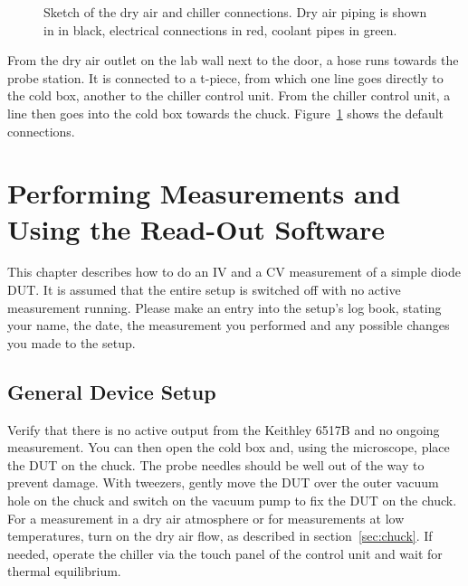 \documentclass[a4paper]{article}
\begin{document}
\begin{figure}[hbtp!]
\caption[Dry Air and Chiller Connections]{Sketch of the dry air and chiller connections. Dry air piping is shown in in black, electrical connections in red, coolant pipes in green.}
\label{fig:dryair}
\end{figure}

From the dry air outlet on the lab wall next to the door, a hose runs towards the probe station.
It is connected to a t-piece, from which one line goes directly to the cold box, another to the chiller control unit.
From the chiller control unit, a line then goes into the cold box towards the chuck.
Figure~\ref{fig:dryair} shows the default connections.\\

\afterpage{\null\newpage} %
\newpage

\section{Performing Measurements and Using the Read-Out Software}
\label{sec:meas}

This chapter describes how to do an IV and a CV measurement of a simple diode DUT.
It is assumed that the entire setup is switched off with no active measurement running.
Please make an entry into the setup's log book, stating your name, the date, the measurement you performed and any possible changes you made to the setup.\\

\subsection{General Device Setup}
\label{sec:devicesetup}

Verify that there is no active output from the Keithley 6517B and no ongoing measurement.
You can then open the cold box and, using the microscope, place the DUT on the chuck.
The probe needles should be well out of the way to prevent damage.
With tweezers, gently move the DUT over the outer vacuum hole on the chuck and switch on the vacuum pump to fix the DUT on the chuck.
For a measurement in a dry air atmosphere or for measurements at low temperatures, turn on the dry air flow, as described in section~\ref{sec:chuck}.
If needed, operate the chiller via the touch panel of the control unit and wait for thermal equilibrium.\\
\end{document}
